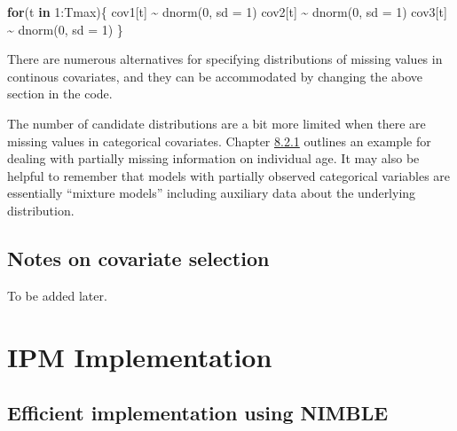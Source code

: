 \documentclass[
]{book}
\newenvironment{Shaded}{\begin{snugshade}}{\end{snugshade}}
\newcommand{\AttributeTok}[1]{\textcolor[rgb]{0.77,0.63,0.00}{#1}}
\newcommand{\ControlFlowTok}[1]{\textcolor[rgb]{0.13,0.29,0.53}{\textbf{#1}}}
\newcommand{\DecValTok}[1]{\textcolor[rgb]{0.00,0.00,0.81}{#1}}
\newcommand{\FunctionTok}[1]{\textcolor[rgb]{0.00,0.00,0.00}{#1}}
\newcommand{\NormalTok}[1]{#1}
\newcommand{\SpecialCharTok}[1]{\textcolor[rgb]{0.00,0.00,0.00}{#1}}
\begin{document}
\begin{Shaded}
\begin{Highlighting}[]
\ControlFlowTok{for}\NormalTok{(t }\ControlFlowTok{in} \DecValTok{1}\SpecialCharTok{:}\NormalTok{Tmax)\{}
\NormalTok{  cov1[t] }\SpecialCharTok{\textasciitilde{}} \FunctionTok{dnorm}\NormalTok{(}\DecValTok{0}\NormalTok{, }\AttributeTok{sd =} \DecValTok{1}\NormalTok{)}
\NormalTok{  cov2[t] }\SpecialCharTok{\textasciitilde{}} \FunctionTok{dnorm}\NormalTok{(}\DecValTok{0}\NormalTok{, }\AttributeTok{sd =} \DecValTok{1}\NormalTok{)}
\NormalTok{  cov3[t] }\SpecialCharTok{\textasciitilde{}} \FunctionTok{dnorm}\NormalTok{(}\DecValTok{0}\NormalTok{, }\AttributeTok{sd =} \DecValTok{1}\NormalTok{)}
\NormalTok{\}}
\end{Highlighting}
\end{Shaded}

There are numerous alternatives for specifying distributions of missing values
in continous covariates, and they can be accommodated by changing the above
section in the code.

The number of candidate distributions are a bit more limited when there are
missing values in categorical covariates.
Chapter \protect\hyperlink{ux5cux23ux5cux23ux5cux2520Includingux5cux2520partiallyux5cux2520observedux5cux2520ageux5cux2520information}{8.2.1} outlines an
example for dealing with partially missing information on individual age. It
may also be helpful to remember that models with partially observed categorical
variables are essentially ``mixture models'' including auxiliary data about the
underlying distribution.

\hypertarget{notes-on-covariate-selection}{%
\section{Notes on covariate selection}\label{notes-on-covariate-selection}}

To be added later.

\hypertarget{IPMImp}{%
\chapter{IPM Implementation}\label{IPMImp}}

\hypertarget{efficient-implementation-using-nimble}{%
\section{Efficient implementation using NIMBLE}\label{efficient-implementation-using-nimble}}
\end{document}
